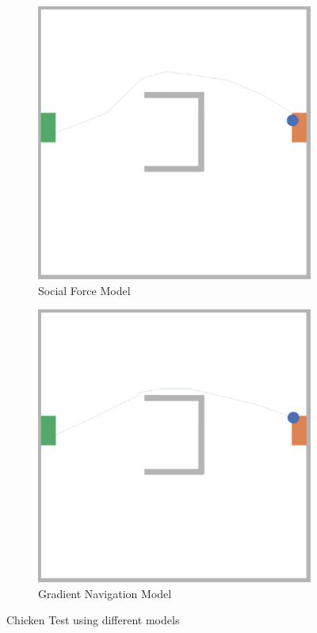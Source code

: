 \begin{figure}[H]
\begin{subfigure}[b]{0.3\textwidth}
     \includegraphics[width=\textwidth]{images/2-sfm-chicken.png}
     \caption{Social Force Model}
     \label{fig: chicken-sfm}
 \end{subfigure}
 \begin{subfigure}[b]{0.3\textwidth}
      \centering
     \includegraphics[width=\textwidth]{images/2-gnm-chicken.png}
     \caption{Gradient Navigation Model}
     \label{fig: chicken-gnm}
 \end{subfigure}
 \caption{Chicken Test using different models}
 \label{fig: chicken-task2}
\end{figure}